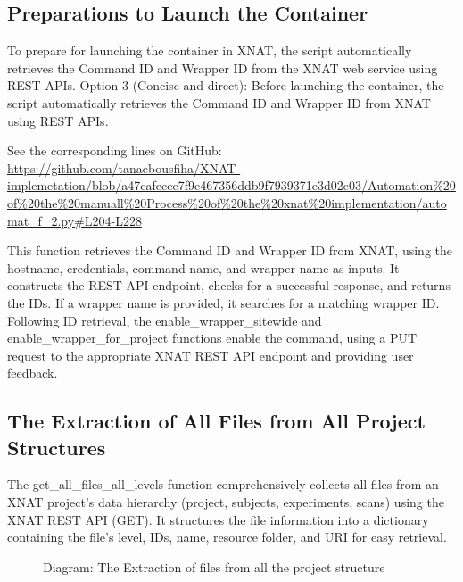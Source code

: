 \subsection{Preparations to Launch the Container}

To prepare for launching the container in XNAT, the script automatically retrieves the Command ID and Wrapper ID from the XNAT web service using REST APIs.
Option 3 (Concise and direct): Before launching the container, the script automatically retrieves the Command ID and Wrapper ID from XNAT using REST APIs.


\noindent\footnotesize See the corresponding lines on GitHub:\url{ https://github.com/tanaebousfiha/XNAT-implemetation/blob/a47cafecee7f9e467356ddb9f7939371e3d02e03/Automation%20of%20the%20manuall%20Process%20of%20the%20xnat%20implementation/automat_f_2.py#L204-L228}
\normalsize


This function retrieves the Command ID and Wrapper ID from XNAT, using the hostname, credentials, command name, and wrapper name as inputs. It constructs the REST API endpoint, checks for a successful response, and returns the IDs. If a wrapper name is provided, it searches for a matching wrapper ID. Following ID retrieval, the enable\_wrapper\_sitewide and enable\_wrapper\_for\_project functions enable the command, using a PUT request to the appropriate XNAT REST API endpoint and providing user feedback.

\subsection{The Extraction of All Files from All Project Structures}

The get\_all\_files\_all\_levels function comprehensively collects all files from an XNAT project's data hierarchy (project, subjects, experiments, scans) using the XNAT REST API (GET). It structures the file information into a dictionary containing the file's level, IDs, name, resource folder, and URI for easy retrieval.

\begin{figure}[ht]
    \centering
    \def\svgwidth{0.9\linewidth}
    
    \caption{Diagram: The Extraction of files from all the project structure}
    \label{fig:enter-label}
\end{figure}

